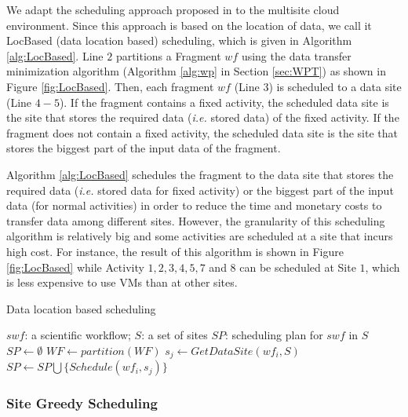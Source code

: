We adapt the scheduling approach proposed in \cite{Liu2014} to the multisite cloud environment. Since this approach is based on the location of data, we call it LocBased (data location based) scheduling, which is given in Algorithm \ref{alg:LocBased}. Line $2$ partitions a Fragment $wf$ using the data transfer minimization algorithm (Algorithm \ref{alg:wp} in Section \ref{sec:WPT}) as shown in Figure \ref{fig:LocBased}. Then, each fragment $wf$ (Line $3$) is scheduled to a data site (Line $4-5$). If the fragment contains a fixed activity, the scheduled data site is the site that stores the required data (\textit{i.e.} stored data) of the fixed activity. If the fragment does not contain a fixed activity, the scheduled data site is the site that stores the biggest part of the input data of the fragment.

Algorithm \ref{alg:LocBased} schedules the fragment to the data site that stores the required data (\textit{i.e.} stored data for fixed activity) or the biggest part of the input data (for normal activities) in order to reduce the time and monetary costs to transfer data among different sites. However, the granularity of this scheduling algorithm is relatively big and some activities are scheduled at a site that incurs high cost. For instance, the result of this algorithm is shown in Figure \ref{fig:LocBased} while Activity $1, 2, 3, 4, 5, 7$ and $8$ can be scheduled at Site $1$, which is less expensive to use VMs than at other sites.

\begin{algorithm}
\caption{Data location based scheduling}\label{alg:LocBased}
\begin{algorithmic}[1]
\INPUT $swf$: a scientific workflow; $S$: a set of sites
\OUTPUT $SP$: scheduling plan for $swf$ in $S$
\State $SP\gets \emptyset$
\State $WF\gets partition( WF )$ 
\State 	$s_j\gets GetDataSite( wf_i, S )$ 
\State	$SP \gets SP \bigcup \{ Schedule( wf_i , s_j ) \}$
\EndFor
\ENDBEGIN
\end{algorithmic}
\end{algorithm}

\subsubsection{Site Greedy Scheduling}
\label{sec:SGS}

